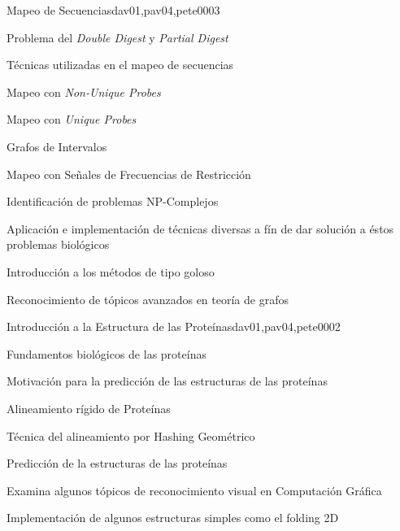 \begin{syllabus}
\begin{unit}{Mapeo de Secuencias}{dav01,pav04,pete00}{0}{3}
\begin{topics}
        \item Problema del \textit{Double Digest} y \textit{Partial Digest}
        \item Técnicas utilizadas en el mapeo de secuencias
        \item Mapeo con \textit{Non-Unique Probes}
        \item Mapeo con \textit{Unique Probes}
        \item Grafos de Intervalos
        \item Mapeo con Señales de Frecuencias de Restricción
    \end{topics}
    \begin{learningoutcomes}
        \item Identificación de problemas NP-Complejos
        \item Aplicación e implementación de técnicas diversas a fín de dar solución a éstos problemas biológicos
        \item Introducción a los métodos de tipo goloso
        \item Reconocimiento de tópicos avanzados en teoría de grafos
    \end{learningoutcomes}
\end{unit}

\begin{unit}{Introducción a la Estructura de las Proteínas}{dav01,pav04,pete00}{0}{2}
\begin{topics}
        \item Fundamentos biológicos de las proteínas
        \item Motivación para la predicción de las estructuras de las proteínas
        \item Alineamiento rígido de Proteínas
        \item Técnica del alineamiento por Hashing Geométrico
        \item Predicción de la estructuras de las proteínas
    \end{topics}

    \begin{learningoutcomes}
        \item Examina algunos tópicos de reconocimiento visual en Computación Gráfica
        \item Implementación de algunos estructuras simples como el folding 2D
    \end{learningoutcomes}
\end{unit}



\begin{coursebibliography}
\end{coursebibliography}

\end{syllabus}
